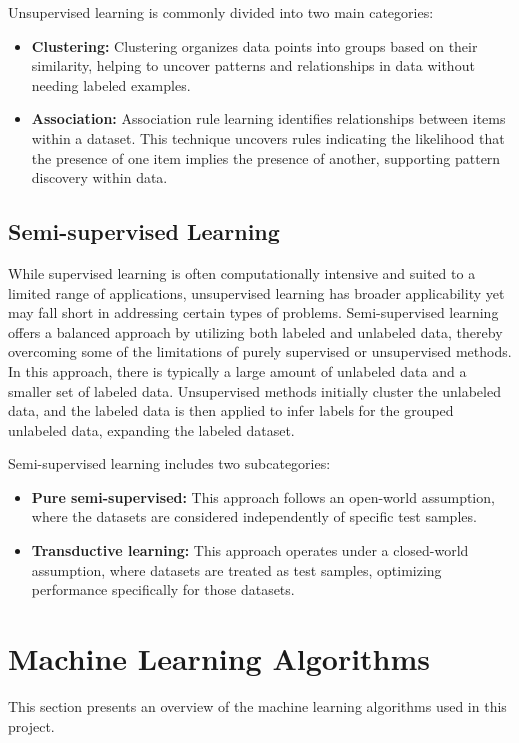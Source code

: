 \documentclass[12pt]{report}
\begin{document}
    Unsupervised learning is commonly divided into two main categories:
    \begin{itemize}
        \item {\bfseries Clustering:} Clustering organizes data points into groups based on their similarity, helping to uncover patterns and relationships in data without needing labeled examples.
        \item {\bfseries Association:} Association rule learning identifies relationships between items within a dataset. This technique uncovers rules indicating the likelihood that the presence of one item implies the presence of another, supporting pattern discovery within data.
    \end{itemize}

    \subsection{Semi-supervised Learning}
    While supervised learning is often computationally intensive and suited to a limited range of applications, unsupervised learning has broader applicability yet may fall short in addressing certain types of problems. Semi-supervised learning offers a balanced approach by utilizing both labeled and unlabeled data, thereby overcoming some of the limitations of purely supervised or unsupervised methods. In this approach, there is typically a large amount of unlabeled data and a smaller set of labeled data. Unsupervised methods initially cluster the unlabeled data, and the labeled data is then applied to infer labels for the grouped unlabeled data, expanding the labeled dataset.
    
    Semi-supervised learning includes two subcategories:

    \begin{itemize}
        \item {\bfseries Pure semi-supervised:} This approach follows an open-world assumption, where the datasets are considered independently of specific test samples.
        
        \item {\bfseries Transductive learning:} This approach operates under a closed-world assumption, where datasets are treated as test samples, optimizing performance specifically for those datasets.
    \end{itemize}

    \section{Machine Learning Algorithms}
    This section presents an overview of the machine learning algorithms used in this project.
\end{document}
